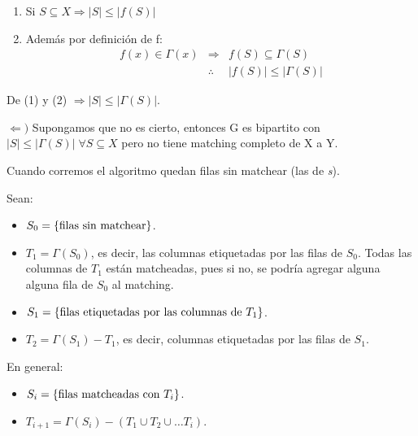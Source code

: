 \documentclass[12pt,a4paper]{report}
\begin{document}
  			\begin{enumerate}
  				\item Si $S \subseteq X \Rightarrow \lvert S \rvert \leq \lvert f(S) \rvert$
  				\item Además por definición de f:
  					\begin{eqnarray}
  						\nonumber f(x) \in \Gamma(x) &\Rightarrow & f(S) \subseteq \Gamma(S) \\
  						\nonumber &\therefore & \lvert f(S) \rvert \leq \lvert \Gamma(S) \rvert
  					\end{eqnarray}
  			\end{enumerate}
  			\par De (1) y (2) $\Rightarrow \lvert S \rvert \leq \lvert \Gamma(S) \rvert$.

  			\vspace{5mm}
  			\par $\Leftarrow)$ Supongamos que no es cierto, entonces G es bipartito con $\lvert S \rvert \leq \lvert \Gamma(S) \rvert \; \forall S \subseteq X$ pero no tiene matching completo de X a Y.

  			\vspace{5 mm}
  			\par Cuando corremos el algoritmo quedan filas sin matchear (las de \textit{s}).

  			\pagebreak
  			\par Sean:
  			\begin{itemize}
  				\item $S_{0} = \lbrace \textup{filas sin matchear} \rbrace$.
  				\item $T_{1} = \Gamma(S_{0})$, es decir, las columnas etiquetadas por las filas de $S_{0}$. Todas las columnas de $T_{1}$ están matcheadas, pues si no, se podría agregar alguna alguna fila de $S_{0}$ al matching.
  				\item $S_{1} = \lbrace \textup{filas etiquetadas por las columnas de } T_{1}\rbrace$.
  				\item $T_{2} = \Gamma(S_{1}) - T_{1}$, es decir, columnas etiquetadas por las filas de $S_{1}$.
  			\end{itemize}

  			\par En general:
  			\begin{center}
  				\begin{itemize}
  					\item $S_{i} = \lbrace \textup{filas matcheadas con } T_{i}\rbrace$.
  					\item $T_{i+1} = \Gamma(S_{i}) - (T_{1} \cup T_{2} \cup \dotsc T_{i})$.
  				\end{itemize}
  			\end{center}
\end{document}

